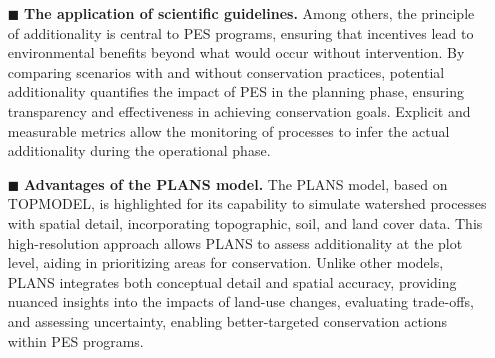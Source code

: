 \documentclass[./main_en.tex]{subfiles}
\begin{document}
\begin{itemize}
    \item[$\blacksquare$] \textbf{The application of scientific guidelines.} Among others, the principle of additionality is central to PES programs, ensuring that incentives lead to environmental benefits beyond what would occur without intervention. By comparing scenarios with and without conservation practices, potential additionality quantifies the impact of PES in the planning phase, ensuring transparency and effectiveness in achieving conservation goals. Explicit and measurable metrics allow the monitoring of processes to infer the actual additionality during the operational phase.
    
    \item[$\blacksquare$] \textbf{Advantages of the PLANS model.} The PLANS model, based on TOPMODEL, is highlighted for its capability to simulate watershed processes with spatial detail, incorporating topographic, soil, and land cover data. This high-resolution approach allows PLANS to assess additionality at the plot level, aiding in prioritizing areas for conservation. Unlike other models, PLANS integrates both conceptual detail and spatial accuracy, providing nuanced insights into the impacts of land-use changes, evaluating trade-offs, and assessing uncertainty, enabling better-targeted conservation actions within PES programs.
    
\end{itemize}
\end{document}
